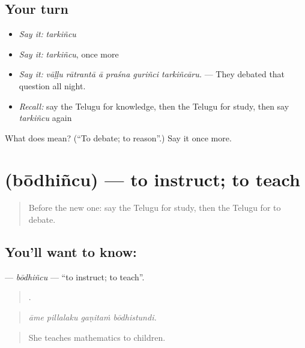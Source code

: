 \subsection*{Your turn}
\begin{itemize}
\raggedright
  \item \emph{Say it:} \emph{tarkiñcu}
  \item \emph{Say it:} \emph{tarkiñcu}, once more
  \item \emph{Say it:} \emph{vāḷḷu rātrantā ā praśna guriñci tarkiñcāru.} — They debated that question all night.
  \item \emph{Recall:} say the Telugu for knowledge, then the Telugu for study, then say \emph{tarkiñcu} again
\end{itemize}

\begin{tcolorbox}[breakable,colback=teal!4,colframe=teal!35!black,title={Before you move on}]
What does  mean? (\textquotedblleft{}To debate; to reason\textquotedblright{}.) Say it once more.
\end{tcolorbox}
\section[\texorpdfstring{\te{బోధించు} (bōdhiñcu)}{బోధించు (bōdhiñcu)}]{ (bōdhiñcu) — to instruct; to teach}

\label{lesson:TE-C415-bodhincu}



\begin{quote}
Before the new one: say the Telugu for study, then the Telugu for to debate.
\end{quote}

\subsection*{You'll want to know: }
\textbf{} — \emph{bōdhiñcu} — \textquotedblleft{}to instruct; to teach\textquotedblright{}.

\begin{quote}
   .
\end{quote}

\begin{quote}
\emph{āme pillalaku gaṇitaṁ bōdhistundi.}
\end{quote}

\begin{quote}
She teaches mathematics to children.
\end{quote}

